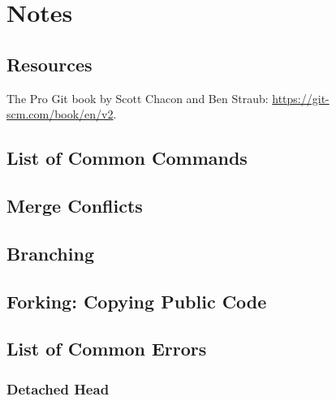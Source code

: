 \documentclass[12pt, letterpaper]{article} 	%
\begin{document}
\section{Notes}

\subsection{Resources}
The Pro Git book by Scott Chacon and Ben Straub\cite{ProGit}: \url{https://git-scm.com/book/en/v2}.


\subsection{List of Common Commands}

\subsection{Merge Conflicts}

\subsection{Branching}

\subsection{Forking: Copying Public Code}

\subsection{List of Common Errors}

\subsubsection{Detached Head}

\clearpage

\end{document}
